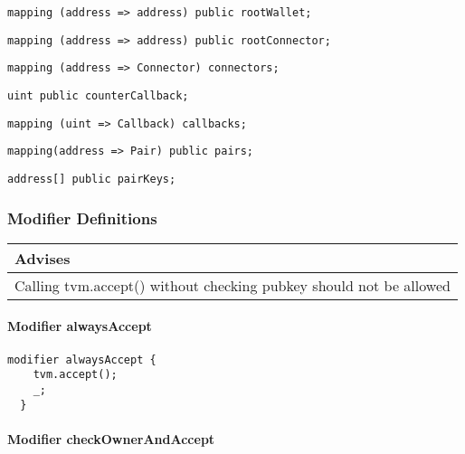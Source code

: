 \begin{lstlisting}[firstnumber=36]
  mapping (address => address) public rootWallet;
\end{lstlisting}

\begin{lstlisting}[firstnumber=37]
  mapping (address => address) public rootConnector;
\end{lstlisting}

\begin{lstlisting}[firstnumber=38]
  mapping (address => Connector) connectors;
\end{lstlisting}

\begin{lstlisting}[firstnumber=40]
  uint public counterCallback;
\end{lstlisting}

\begin{lstlisting}[firstnumber=57]
  mapping (uint => Callback) callbacks;
\end{lstlisting}

\begin{lstlisting}[firstnumber=69]
  mapping(address => Pair) public pairs;
\end{lstlisting}

\begin{lstlisting}[firstnumber=70]
  address[] public pairKeys;
\end{lstlisting}

\subsubsection{Modifier Definitions}


\ifsoldraft
\noindent\begin{tabular}{|p{12cm}|}\hline
\rowcolor{green}Advises
\\\hline
Calling tvm.accept() without checking pubkey should not be allowed
\\\hline\end{tabular}
\fi

\paragraph{Modifier alwaysAccept}


\begin{lstlisting}[firstnumber=73]
  modifier alwaysAccept {
    tvm.accept();
    _;
  }
\end{lstlisting}

\paragraph{Modifier checkOwnerAndAccept}


